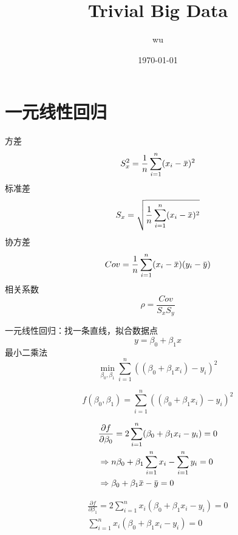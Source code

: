 \documentclass[11pt]{article}
\author{wu}
\date{\today}
\title{Trivial Big Data}
\begin{document}
\maketitle
\tableofcontents


\section{一元线性回归}
\label{sec:org86d6c6d}
方差
\begin{equation*}
S^2_x=\frac{1}{n}\sum_{i=1}^n(x_i-\barx)^2
\end{equation*}
标准差
\begin{equation*}
S_x=\sqrt{\frac{1}{n}\sum_{i=1}^n(x_i-\barx)^2}
\end{equation*}
协方差
\begin{equation*}
Cov=\frac{1}{n}\sum_{i=1}^n(x_i-\barx)(y_i-\bary)
\end{equation*}
相关系数
\begin{equation*}
\rho=\frac{Cov}{S_xS_y}
\end{equation*}

一元线性回归：找一条直线，拟合数据点
\begin{equation*}
y=\beta_0+\beta_1x
\end{equation*}
最小二乘法
\begin{equation*}
\min_{\beta_0,\beta_1}\sum_{i=1}^n((\beta_0+\beta_1x_i)-y_i)^2
\end{equation*}

\begin{equation*}
f(\beta_0,\beta_1)=\sum_{i=1}^n((\beta_0+\beta_1x_i)-y_i)^2
\end{equation*}

\begin{align*}
&\frac{\partial f}{\partial\beta_0}=2\sum_{i=1}^n(\beta_0+\beta_1x_i-y_i)=0\\
&\Rightarrow n\beta_0+\beta_1\sum_{i=1}^nx_i-\sum_{i=1}^ny_i=0\\
&\Rightarrow\beta_0+\beta_1\barx-\bary=0
\end{align*}

\begin{gather*}
\frac{\partial f}{\partial\beta_1}=2\sum_{i=1}^nx_i(\beta_0+\beta_1x_i-y_i)=0\\
\sum_{i=1}^nx_i(\beta_0+\beta_1x_i-y_i)=0
\end{gather*}
\end{document}
